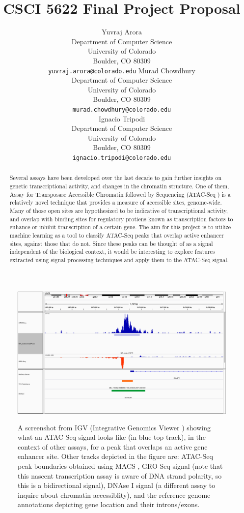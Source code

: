 \documentclass{article}
\title{CSCI 5622 Final Project Proposal}
\author{Yuvraj Arora\\
  Department of Computer Science\\
  University of Colorado\\
  Boulder, CO 80309\\
  \texttt{yuvraj.arora@colorado.edu}
\And
  Murad Chowdhury\\
  Department of Computer Science\\
  University of Colorado\\
  Boulder, CO 80309 \\
  \texttt{murad.chowdhury@colorado.edu} \\
  \And
  Ignacio Tripodi\\
  Department of Computer Science\\
  University of Colorado\\
  Boulder, CO 80309\\
  \texttt{ignacio.tripodi@colorado.edu}
}
\begin{document}
\maketitle

\begin{abstract}
  Several assays have been developed over the last decade to gain further
  insights on genetic transcriptional activity, and changes in the chromatin
  structure.  One of them, Assay for Transposase Accessible Chromatin followed
  by Sequencing (ATAC-Seq \citep{atac}) is a relatively novel technique that
  provides a measure of accessible sites, genome-wide.  Many of those open
  sites are hypothesized to be indicative of transcriptional activity, and
  overlap with binding sites for regulatory protiens known as transcription
  factors to enhance or inhibit transcription of a certain gene.  The aim for
  this project is to utilize machine learning as a tool to classify ATAC-Seq
  peaks that overlap active enhancer sites, against those that do not.  Since
  these peaks can be thought of as a signal independent of the biological
  context, it would be interesting to explore features extracted using signal
  processing techniques and apply them to the ATAC-Seq signal.
\end{abstract}

\begin{figure}[h]
  \centering
  \includegraphics[width=\textwidth]{igvsnapshot}
  \label{igvsnapshot}
  \caption{A screenshot from IGV (Integrative Genomics Viewer \citep{igv})
    showing what an ATAC-Seq signal looks like (in blue top track), in the
    context of other assays, for a peak that overlaps an active gene enhancer
    site.  Other tracks depicted in the figure are:  ATAC-Seq peak boundaries obtained using
    MACS \citep{macs}, GRO-Seq signal (note that this nascent transcription
    assay is aware of DNA strand polarity, so this is a bidirectional signal),
    DNAse I \citep{dnase} signal (a different assay to inquire about chromatin
    accessiblity), and the reference genome annotations depicting gene location
  and their introns/exons.}
\end{figure}
\end{document}
